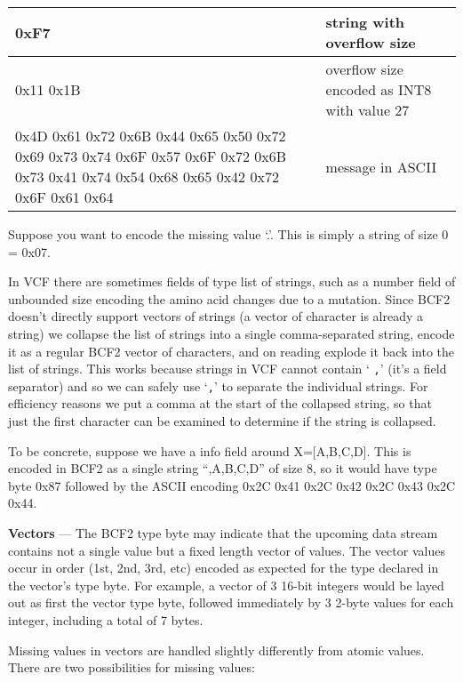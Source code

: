\documentclass[8pt]{article}
\begin{document}
\vspace{0.3cm}
\begin{tabular}{ | p{9cm} | p{6cm} | } \hline
0xF7 & string with overflow size \\ \hline
0x11 0x1B & overflow size encoded as INT8 with value 27 \\ \hline
0x4D 0x61 0x72 0x6B 0x44 0x65 0x50 0x72 0x69 0x73 0x74 0x6F 0x57 0x6F 0x72 0x6B 0x73 0x41 0x74 0x54 0x68 0x65 0x42 0x72 0x6F 0x61 0x64 & message in ASCII \\ \hline
\end{tabular}
\vspace{0.3cm}

Suppose you want to encode the missing value `.'.  This is simply a string of size 0 = 0x07.

\vspace{0.3cm}
In VCF there are sometimes fields of type list of strings, such as a number field of unbounded size encoding the amino acid changes due to a mutation.  Since BCF2 doesn't directly support vectors of strings (a vector of character is already a string) we collapse the list of strings into a single comma-separated string, encode it as a regular BCF2 vector of characters, and on reading explode it back into the list of strings.  This works because strings in VCF cannot contain `{
\tt ,}' (it's a field separator) and so we can safely use `{\tt ,}' to separate the individual strings.  For efficiency reasons we put a comma at the start of the collapsed string, so that just the first character can be examined to determine if the string is collapsed.

To be concrete, suppose we have a info field around X=[A,B,C,D].  This is encoded in BCF2 as a single string ``,A,B,C,D'' of size 8, so it would have type byte 0x87 followed by the ASCII encoding 0x2C 0x41 0x2C 0x42 0x2C 0x43 0x2C 0x44.

\vspace{0.3cm}

\textbf{Vectors} --- The BCF2 type byte may indicate that the upcoming data stream contains not a single value but a fixed length vector of values.  The vector values occur in order (1st, 2nd, 3rd, etc) encoded as expected for the type declared in the vector's type byte.  For example, a vector of 3 16-bit integers would be layed out as first the vector type byte, followed immediately by 3 2-byte values for each integer, including a total of 7 bytes.

Missing values in vectors are handled slightly differently from atomic values.  There are two possibilities for missing values:
\end{document}
